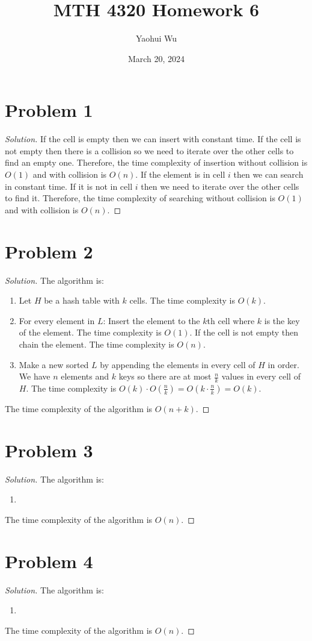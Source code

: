 \documentclass[12pt]{article}
\title{MTH 4320 Homework 6}
\author{Yaohui Wu}
\date{March 20, 2024}
\newenvironment*{solution}{\begin{proof}[Solution]}{\end{proof}}
\begin{document}
\maketitle
\section*{Problem 1}
\begin{solution}
    If the cell is empty then we can insert with constant time. If the cell is
    not empty then there is a collision so we need to iterate over the other
    cells to find an empty one. Therefore, the time complexity of insertion
    without collision is \(O(1)\) and with collision is \(O(n)\). If the
    element is in cell \(i\) then we can search in constant time. If it is not
    in cell \(i\) then we need to iterate over the other cells to find it.
    Therefore, the time complexity of searching without collision is \(O(1)\)
    and with collision is \(O(n)\).
\end{solution}
\section*{Problem 2}
\begin{solution}
    The algorithm is:
    \begin{enumerate}
        \item Let \(H\) be a hash table with \(k\) cells. The time complexity
        is \(O(k)\).
        \item For every element in \(L\): Insert the element to the \(k\)th
        cell where \(k\) is the key of the element. The time complexity is
        \(O(1)\). If the cell is not empty then chain the element. The time
        complexity is \(O(n)\).
        \item Make a new sorted \(L\) by appending the elements in every cell
        of \(H\) in order. We have \(n\) elements and \(k\) keys so there are
        at most \(\frac{n}{k}\) values in every cell of \(H\). The time
        complexity is \(O(k)\cdot O(\frac{n}{k})=O(k\cdot\frac{n}{k})=O(k)\).
    \end{enumerate}
    The time complexity of the algorithm is \(O(n+k)\).
\end{solution}
\section*{Problem 3}
\begin{solution}
    The algorithm is:
    \begin{enumerate}
        \item 
    \end{enumerate}
    The time complexity of the algorithm is \(O(n)\).
\end{solution}
\section*{Problem 4}
\begin{solution}
    The algorithm is:
    \begin{enumerate}
        \item 
    \end{enumerate}
    The time complexity of the algorithm is \(O(n)\).
\end{solution}
\end{document}
